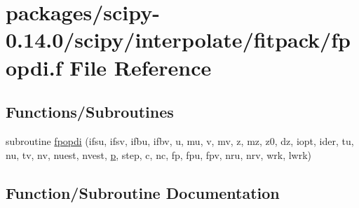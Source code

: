 \hypertarget{fpopdi_8f}{}\section{packages/scipy-\/0.14.0/scipy/interpolate/fitpack/fpopdi.f File Reference}
\label{fpopdi_8f}
\subsection*{Functions/\+Subroutines}
\begin{DoxyCompactItemize}
\item 
subroutine \hyperlink{fpopdi_8f_a71a71615756e4de0f9b31fe9d60c3777}{fpopdi} (ifsu, ifsv, ifbu, ifbv, u, mu, v, mv, z, mz, z0, dz, iopt, ider, tu, nu, tv, nv, nuest, nvest, \hyperlink{indexexpr_8h_a2b8c103eb5bfc196fbc3d29923e28ac1}{p}, step, c, nc, fp, fpu, fpv, nru, nrv, wrk, lwrk)
\end{DoxyCompactItemize}


\subsection{Function/\+Subroutine Documentation}
\hypertarget{fpopdi_8f_a71a71615756e4de0f9b31fe9d60c3777}{}
